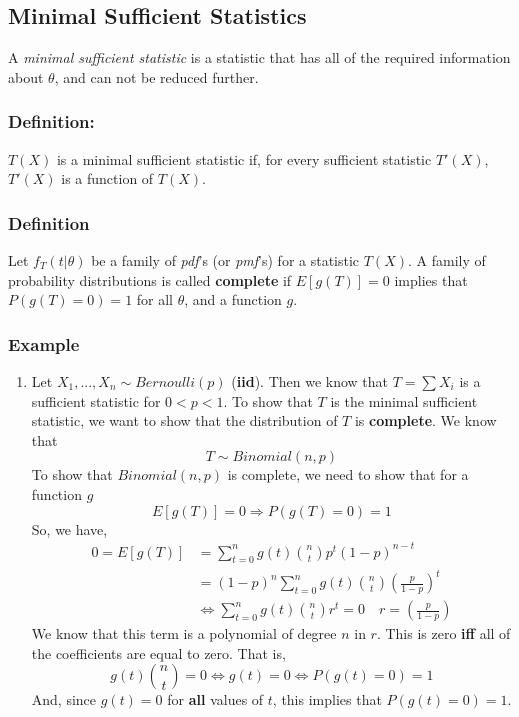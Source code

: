\documentclass{article}
\begin{document}
\subsection{Minimal Sufficient Statistics}
A \textit{minimal sufficient statistic} is a statistic that has all of the required information about $\theta$, and can not be reduced further.
\subsubsection{Definition:}
$T(X)$ is a minimal sufficient statistic if, for every sufficient statistic $T'(X)$, $T'(X)$ is a function of $T(X)$.

\subsubsection{Definition}
Let $f_T(t|\theta)$ be a family of \textit{pdf}'s (or \textit{pmf}'s) for a statistic $T(X)$. A family of probability distributions is called \textbf{complete} if $E[g(T)] = 0$ implies that $P(g(T)=0) = 1$ for all $\theta$, and a function $g$.

\subsubsection*{Example}
\begin{enumerate}
    \item Let $X_1,...,X_n \sim Bernoulli(p)$ (\textbf{iid}). Then we know that $T=\sum X_i$ is a sufficient statistic for $0 < p < 1$. To show that $T$ is the minimal sufficient statistic, we want to show that the distribution of $T$ is \textbf{complete}. We know that
    \begin{equation*}
        T \sim Binomial(n,p)
    \end{equation*}
    To show that $Binomial(n,p)$ is complete, we need to show that for a function $g$
    \begin{equation*}
        E[g(T)] = 0 \Rightarrow P(g(T) = 0) = 1
    \end{equation*}
    So, we have,
    \begin{equation*}
        \begin{split}
            0 = E[g(T)] &= \sum_{t=0}^n g(t) \binom{n}{t} p^t (1-p)^{n-t}\\
            &= (1-p)^n \sum_{t=0}^n g(t)\binom{n}{t} \left(\frac{p}{1-p} \right)^t \\
            &\iff \sum_{t=0}^n g(t) \binom{n}{t} r^t = 0 \quad r=\left(\frac{p}{1-p} \right)
        \end{split}
    \end{equation*}
    We know that this term is a polynomial of degree $n$ in $r$. This is zero \textbf{iff} all of the coefficients are equal to zero. That is,
    \begin{equation*}
        g(t)\binom{n}{t} = 0 \iff g(t) = 0 \iff P(g(t)=0) = 1
    \end{equation*}
    And, since $g(t) = 0$ for \textbf{all} values of $t$, this implies that $P(g(t) =0) = 1$.
\end{enumerate}
\end{document}

